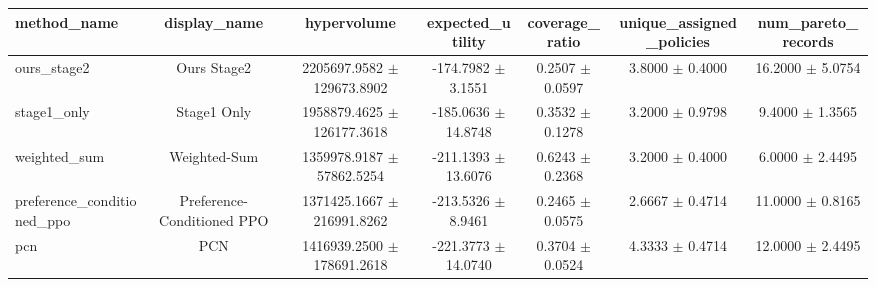 \begin{tabular}{lcccccc}
\hline
method\_name & display\_name & hypervolume & expected\_utility & coverage\_ratio & unique\_assigned\_policies & num\_pareto\_records \\
\hline
ours\_stage2 & Ours Stage2 & 2205697.9582 $\pm$ 129673.8902 & -174.7982 $\pm$ 3.1551 & 0.2507 $\pm$ 0.0597 & 3.8000 $\pm$ 0.4000 & 16.2000 $\pm$ 5.0754 \\
stage1\_only & Stage1 Only & 1958879.4625 $\pm$ 126177.3618 & -185.0636 $\pm$ 14.8748 & 0.3532 $\pm$ 0.1278 & 3.2000 $\pm$ 0.9798 & 9.4000 $\pm$ 1.3565 \\
weighted\_sum & Weighted-Sum & 1359978.9187 $\pm$ 57862.5254 & -211.1393 $\pm$ 13.6076 & 0.6243 $\pm$ 0.2368 & 3.2000 $\pm$ 0.4000 & 6.0000 $\pm$ 2.4495 \\
preference\_conditioned\_ppo & Preference-Conditioned PPO & 1371425.1667 $\pm$ 216991.8262 & -213.5326 $\pm$ 8.9461 & 0.2465 $\pm$ 0.0575 & 2.6667 $\pm$ 0.4714 & 11.0000 $\pm$ 0.8165 \\
pcn & PCN & 1416939.2500 $\pm$ 178691.2618 & -221.3773 $\pm$ 14.0740 & 0.3704 $\pm$ 0.0524 & 4.3333 $\pm$ 0.4714 & 12.0000 $\pm$ 2.4495 \\
\hline
\end{tabular}
